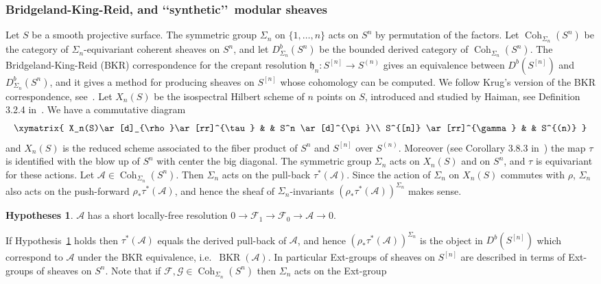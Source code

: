 \documentclass[11pt]{amsart}
\let\mathcal\mathscr
\def\cA{\mathcal{A}}
\def\cF{\mathcal{F}}
\def\cG{\mathcal{G}}
\def\goth{\mathfrak h}
\DeclareMathOperator{\BKR}{BKR}
\DeclareMathOperator{\Coh}{Coh}
\def\lra{\longrightarrow}
\theoremstyle{definition}
\newtheorem{hyp}[lmm]{Hypotheses}
\theoremstyle{remark}
\begin{document}
\subsubsection{Bridgeland-King-Reid, and \lq\lq synthetic\rq\rq\ modular sheaves}
%
Let $S$ be a smooth projective surface. The symmetric group $\Sigma_n$ on $\{1,\ldots,n\}$ acts  on $S^n$ by permutation of the factors. Let $\Coh_{\Sigma_n}(S^n)$ be the category of $\Sigma_n$-equivariant coherent sheaves on $S^n$, and let 
$D^b_{\Sigma_n}(S^n)$ be  the bounded derived category of $\Coh_{\Sigma_n}(S^n)$.
The Bridgeland-King-Reid (BKR) correspondence for the crepant resolution $\goth_n\colon S^{[n]}\to S^{(n)}$ gives an equivalence between 
$D^b(S^{[n]})$ and $D^b_{\Sigma_n}(S^n)$, and it 
 gives a method for producing sheaves on $S^{[n]}$ whose cohomology can be computed. We follow  Krug's version of the BKR correspondence, see~\cite{krug-bkr}. 
Let $X_n(S)$ be the isospectral Hilbert scheme of $n$ points on $S$,  introduced and studied by Haiman,  
 see Definition 3.2.4 in~\cite{haiman:polygraphs}. We have a commutative diagram
%
\begin{equation}\label{commiso}
%
\xymatrix{ X_n(S)\ar[d]_{\rho}\ar[rr]^{\tau}    &  &  S^n \ar[d]^{\pi}\\ 
%
  S^{[n]}  \ar[rr]^{\gamma} & & S^{(n)} }
%
\end{equation}
%
and $X_n(S)$ is the reduced scheme associated to the fiber product of $S^n$ and $S^{[n]}$ over $S^{(n)}$. 
Moreover (see Corollary 3.8.3 in~\cite{haiman:polygraphs}) the map $\tau$ is identified with the blow up of $S^n$ with center the big diagonal. The symmetric group $\Sigma_n$ acts on $X_n(S)$ and on $S^n$, and $\tau$ is equivariant for these actions. 
Let $\cA\in \Coh_{\Sigma_n}(S^n)$. Then $\Sigma_n$  acts on the pull-back $\tau^{*}(\cA)$. Since  the action of $\Sigma_n$ on  
$X_n(S)$ commutes with $\rho$, $\Sigma_n$  also acts on the push-forward 
$\rho_{*}\tau^{*}(\cA)$, and hence the sheaf of $\Sigma_n$-invariants $\left(\rho_{*}\tau^{*}(\cA)\right)^{\Sigma_n}$ makes sense.
%
\begin{hyp}\label{hyp:riscorta}
%
$\cA$  has a short locally-free resolution $0\lra \cF_1\lra\cF_0\lra\cA\lra 0$.
%
\end{hyp}
%
If Hypothesis~\ref{hyp:riscorta} holds  then $\tau^{*}(\cA)$ equals the derived pull-back of $\cA$, and hence  
$\left(\rho_{*}\tau^{*}(\cA)\right)^{\Sigma_n}$ is the  object in $D^b(S^{[n]})$ which correspond to $\cA$ under the BKR equivalence, 
i.e.~$\BKR(\cA)$. In particular   Ext-groups of sheaves on $S^{[n]}$ are described in terms of Ext-groups of sheaves on $S^{n}$. Note that if   $\cF,\cG\in \Coh_{\Sigma_n}(S^n)$ then $\Sigma_n$ acts on the Ext-group 
\end{document}
